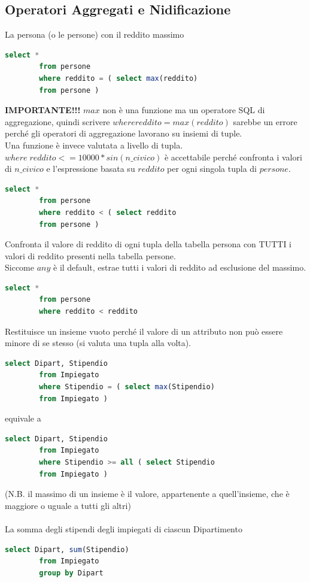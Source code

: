 \documentclass{article}
\begin{document}
	\subsection{Operatori Aggregati e Nidificazione}
	La persona (o le persone) con il reddito massimo
	\begin{lstlisting}[language=SQL]
		select *
		from persone
		where reddito = ( select max(reddito)
		from persone )
	\end{lstlisting}
	\textbf{IMPORTANTE!!!} $max$ non è una funzione ma un operatore SQL di aggregazione, quindi scrivere $where reddito = max(reddito)$ sarebbe un errore perché gli operatori di aggregazione lavorano su insiemi di tuple.\\
	Una funzione è invece valutata a livello di tupla.\\
	$where \; reddito <= 10000*sin(n \_ civico)$ è accettabile perché confronta i valori di $n \_ civico$ e l’espressione basata su $reddito$ per ogni singola tupla di $persone$.
	\begin{lstlisting}[language=SQL]
		select *
		from persone
		where reddito < ( select reddito
		from persone )
	\end{lstlisting}
	Confronta il valore di reddito di ogni tupla della tabella persona con TUTTI i valori di reddito presenti nella tabella persone.\\ Siccome $any$ è il default, estrae tutti i valori di reddito ad esclusione del massimo.
	\begin{lstlisting}[language=SQL]
		select *
		from persone
		where reddito < reddito
	\end{lstlisting}
	Restituisce un insieme vuoto perché il valore di un attributo non può essere minore di se stesso (si valuta una tupla alla volta).
	\begin{lstlisting}[language=SQL]
		select Dipart, Stipendio
		from Impiegato
		where Stipendio = ( select max(Stipendio)
		from Impiegato )
	\end{lstlisting}
	equivale a
	\begin{lstlisting}[language=SQL]
		select Dipart, Stipendio
		from Impiegato
		where Stipendio >= all ( select Stipendio
		from Impiegato )
	\end{lstlisting}
	(N.B. il massimo di un insieme è il valore, appartenente a quell'insieme, che è maggiore o uguale a tutti gli altri)\\\\
	La somma degli stipendi degli impiegati di ciascun Dipartimento
	\begin{lstlisting}[language=SQL]
		select Dipart, sum(Stipendio)
		from Impiegato
		group by Dipart
	\end{lstlisting}
\end{document}
